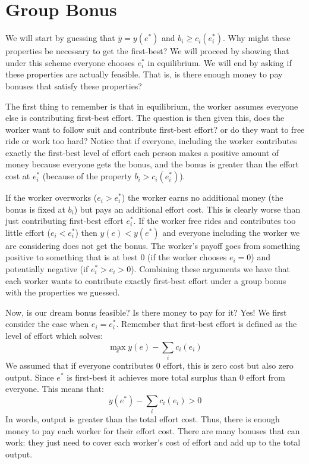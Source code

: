 \documentclass{article}
\begin{document}
\section{Group Bonus}

We will start by guessing that $\bar y = y(e^*)$ and $b_i\geq c_i(e_i^*)$. Why might these properties be necessary to get the first-best? We will proceed by showing that under this scheme everyone chooses $e_i^*$ in equilibrium. We will end by asking if these properties are actually feasible. That is, is there enough money to pay bonuses that satisfy these properties?

The first thing to remember is that in equilibrium, the worker assumes everyone else is contributing first-best effort. The question is then given this, does the worker want to follow suit and contribute first-best effort? or do they want to free ride or work too hard? Notice that if everyone, including the worker contributes exactly the first-best level of effort each person makes a positive amount of money because everyone gets the bonus, and the bonus is greater than the effort cost at $e_i^*$ (because of the property $b_i> c_i(e_i^*)$).


If the worker overworks ($e_i>e_i^*$) the worker earns no additional money (the bonus is fixed at $b_i$) but pays an additional effort cost. This is clearly worse than just contributing first-best effort $e_i^*$. If the worker free rides and contributes too little effort ($e_i<e_i^*$) then $y(e)<y(e^*)$ and everyone including the worker we are considering does not get the bonus. The worker's payoff goes from something positive to something that is at best 0 (if the worker chooses $e_i=0$) and potentially negative (if $e_i^*>e_i>0$). Combining these arguments we have that each worker wants to contribute exactly first-best effort under a group bonus with the properties we guessed.

Now, is our dream bonus feasible? Is there money to pay for it? Yes! We first consider the case when $e_i=e_i^*$. Remember that first-best effort is defined as the level of effort which solves:
\[\max_e y(e) - \sum_i c_i(e_i)\]
We assumed that if everyone contributes 0 effort, this is zero cost but also zero output. Since $e^*$ is first-best it achieves more total surplus than 0 effort from everyone. This means that:
\[y(e^*)- \sum_i c_i(e_i)>0\]
In words, output is greater than the total effort cost. Thus, there is enough money to pay each worker for their effort cost. There are many bonuses that can work: they just need to cover each worker's cost of effort  and add up to the total output.
\end{document}

